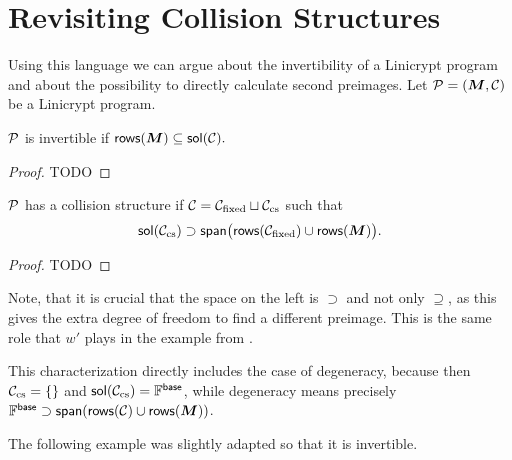 \section{Revisiting Collision Structures}
Using this language we can argue about the invertibility of a Linicrypt program and about the possibility to directly calculate second preimages.
Let $\P = (\M, \C)$ be a Linicrypt program.

\begin{lemma}
    $\P$ is invertible if $\rows(\M) \subseteq \sol(\C).$
\end{lemma}

\begin{proof}
TODO
\end{proof}

\begin{lemma}
    $\P$ has a collision structure
    if $\C = \C_{\textrm{fixed}} \sqcup \C_{\textrm{cs}}$ such that
    \begin{equation}
        \sol(\C_\textrm{cs}) \supset \spn\big(\rows(\C_\textrm{fixed}) \cup \rows(\M)\big).
    \end{equation}
\end{lemma}
\begin{proof}
TODO
\end{proof}

Note, that it is crucial that the space on the left is $\supset$ and not only $\supseteq$,
as this gives the extra degree of freedom to find a different preimage.
This is the same role that $w'$ plays in the example from \cite{RMS20}.

This characterization directly includes the case of degeneracy,
because then $\Ccs = \{\}$ and $\sol(\Ccs) = \Base$,
while degeneracy means precisely $\Base \supset \spn(\rows(\C) \cup \rows(\M))$.

The following example was slightly adapted so that it is invertible.


